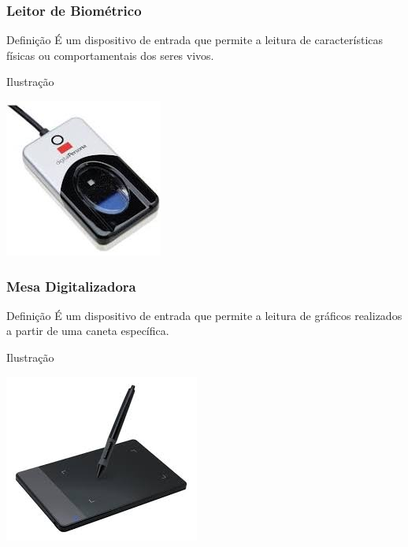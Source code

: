 \documentclass[aspectratio=169]{beamer} %
\begin{document}
\begin{frame}
	\frametitle{Leitor de Biométrico}
	
	\begin{block}{Defini\c cão}
		É um dispositivo de entrada que permite a leitura de características físicas ou comportamentais dos seres vivos.
	\end{block}\vfill
	
	\begin{exampleblock}{Ilustra\c cão}
		\begin{center}
			\includegraphics[scale=0.5]{img/leitor_biometrico}
		\end{center}		
	\end{exampleblock}
\end{frame}

\begin{frame}
	\frametitle{Mesa Digitalizadora}
	
	\begin{block}{Defini\c cão}
		É um dispositivo de entrada que permite a leitura de gráficos realizados a partir de uma caneta específica.
	\end{block}\vfill
	
	\begin{exampleblock}{Ilustra\c cão}
		\begin{center}
			\includegraphics[scale=0.5]{img/mesa_digitalizadora}
		\end{center}		
	\end{exampleblock}
\end{frame}
\end{document}
